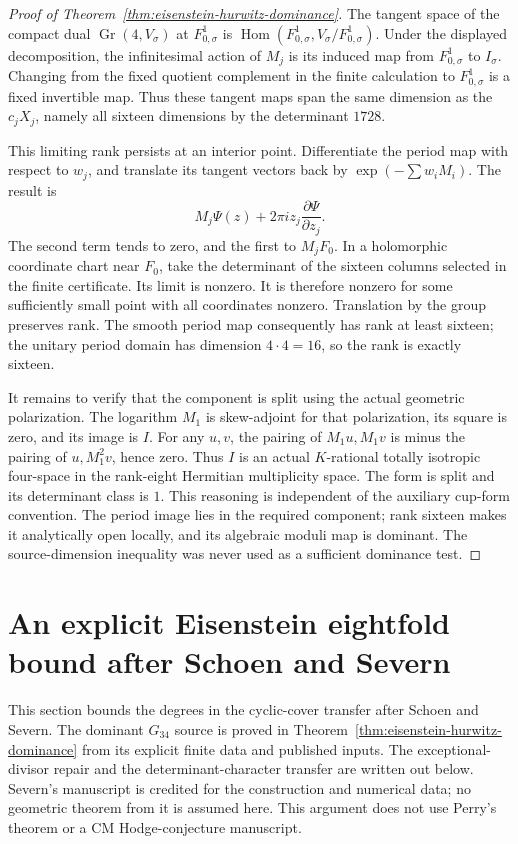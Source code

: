 \documentclass[11pt]{article}
\theoremstyle{definition}
\theoremstyle{remark}
\begin{document}
\begin{proof}[Proof of Theorem~\ref{thm:eisenstein-hurwitz-dominance}]
The tangent space of the compact dual \(\operatorname{Gr}(4,V_\sigma)\)
at \(F_{0,\sigma}^1\) is
\(\operatorname{Hom}(F_{0,\sigma}^1,V_\sigma/F_{0,\sigma}^1)\).
Under the displayed decomposition, the infinitesimal action of \(M_j\)
is its induced map from \(F_{0,\sigma}^1\) to \(I_\sigma\).
Changing from the fixed quotient complement in the finite calculation to
\(F_{0,\sigma}^1\) is a fixed invertible map.  Thus these tangent maps
span the same dimension as the \(c_jX_j\), namely all sixteen dimensions
by the determinant \(1728\).

This limiting rank persists at an interior point.  Differentiate the period
map with respect to \(w_j\), and translate its tangent vectors back by
\(\exp(-\sum w_iM_i)\).  The result is
\[
                   M_j\Psi(z)+2\pi i z_j\frac{\partial\Psi}{\partial z_j}.
\]
The second term tends to zero, and the first to \(M_jF_0\).  In a holomorphic
coordinate chart near \(F_0\), take the determinant of the sixteen columns
selected in the finite certificate.  Its limit is nonzero.  It is therefore
nonzero for some sufficiently small point with all coordinates nonzero.
Translation by the group preserves rank.  The smooth period map consequently
has rank at least sixteen; the unitary period domain has dimension
\(4\cdot4=16\), so the rank is exactly sixteen.

It remains to verify that the component is split using the actual geometric
polarization.  The logarithm \(M_1\) is skew-adjoint for that polarization,
its square is zero, and its image is \(I\).  For any \(u,v\), the pairing
of \(M_1u,M_1v\) is minus the pairing of \(u,M_1^2v\), hence zero.  Thus
\(I\) is an actual \(K\)-rational totally isotropic four-space in the
rank-eight Hermitian multiplicity space.  The form is split and its
determinant class is \(1\).  This reasoning is independent of the auxiliary
cup-form convention.  The period image lies in the required component;
rank sixteen makes it analytically open locally, and its algebraic moduli
map is dominant.  The source-dimension inequality was never used as a
sufficient dominance test.
\end{proof}


\section{An explicit Eisenstein eightfold bound after Schoen and Severn}
\label{sec:eisenstein-eightfolds}
This section bounds the degrees in the cyclic-cover transfer after
Schoen and Severn.  The dominant $G_{34}$ source is proved in
Theorem~\ref{thm:eisenstein-hurwitz-dominance} from its explicit finite
data and published inputs.  The exceptional-divisor repair and the
determinant-character transfer are written out below.  Severn's
manuscript \cite{Severn} is credited for the construction and numerical
data; no geometric theorem from it is assumed here.  This argument
does not use Perry's theorem or a CM Hodge-conjecture manuscript.
\end{document}
